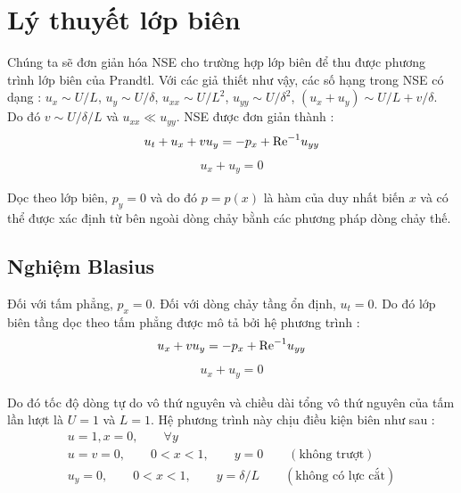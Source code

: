 \documentclass[KHI_DONG_HOC.tex]{subfiles}
\begin{document}
\section{Lý thuyết lớp biên}
Chúng ta sẽ đơn giản hóa NSE cho trường hợp lớp biên để thu được phương trình lớp biên của Prandtl. Với các giả thiết như vậy, các số hạng trong NSE có dạng : $u_x \sim U/L$, $u_y \sim U/\delta$, $u_{xx} \sim U/L^2$, $u_{yy} \sim U/\delta^2$, $(u_x + u_y) \sim U/L + v/\delta$. Do đó $v \sim U/\delta/L$ và $u_{xx} \ll u_{yy}$. NSE được đơn giản thành :
\begin{equation}
	\begin{aligned}
		{u_t} + {u_{x}} + v{u_y} =  - {p_x} + {{\mathop{\rm Re}\nolimits} ^{ - 1}}{u_{yy}}
	\end{aligned}
\end{equation}
\begin{equation}
	\begin{aligned}
		{u_x} + {u_y} = 0
	\end{aligned}
\end{equation}

Dọc theo lớp biên, $p_y=0$ và do đó $p=p(x)$ là hàm của duy nhất biến $x$ và có thể được xác định từ bên ngoài dòng chảy bằnh các phương pháp dòng chảy thế.
\subsection{Nghiệm Blasius}
Đối với tấm phẳng, $p_x=0$. Đối với dòng chảy tầng ổn định, $u_t=0$. Do đó lớp biên tầng dọc theo tấm phẳng được mô tả bởi hệ phương trình :
\begin{equation}
	\begin{aligned}
		{u_{x}} + v{u_y} =  - {p_x} + {{\mathop{\rm Re}\nolimits} ^{ - 1}}{u_{yy}}
	\end{aligned}
\end{equation}
\begin{equation}
	\begin{aligned}
		{u_x} + {u_y} = 0
	\end{aligned}
\end{equation}

Do đó tốc độ dòng tự do vô thứ nguyên và chiều dài tổng vô thứ nguyên của tấm lần lượt là $U=1$ và $L=1$. Hệ phương trình này chịu điều kiện biên như sau :
\[\begin{array}{l}
	u = 1,x = 0,\qquad\forall y\\
	u = v = 0,\qquad 0 < x < 1,\qquad y = 0\qquad (\text{không trượt})\\
	{u_y} = 0,\qquad 0 < x < 1,\qquad y = \delta /L \qquad (\text{không có lực cắt})
	\end{array}\]
\end{document}
